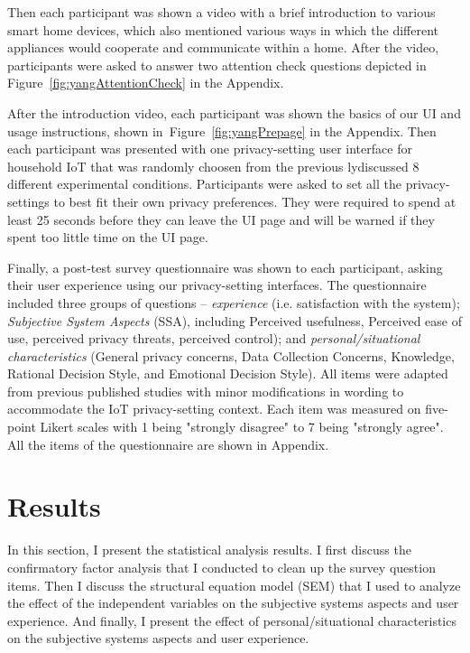 Then each participant was shown a video with a brief introduction to various smart home devices, which also mentioned various ways in which the different appliances would cooperate and communicate within a home. After the video, participants were asked to answer two attention check questions depicted in Figure~\ref{fig:yangAttentionCheck} in the Appendix.

After the introduction video, each participant was shown the basics of our UI and usage instructions, shown in~Figure~\ref{fig:yangPrepage} in the Appendix. Then each participant was presented with one privacy-setting user interface for household IoT that was randomly choosen from the previous lydiscussed 8 different experimental conditions. Participants were asked to set all the privacy-settings to best fit their own privacy preferences. They were required to spend at least 25 seconds before they can leave the UI page and will be warned if they spent too little time on the UI page.

Finally, a post-test survey questionnaire was shown to each participant, asking their user experience using our privacy-setting interfaces. The questionnaire included three groups of questions -- \textit{experience} (i.e. satisfaction with the system); \textit{Subjective System Aspects} (SSA), including Perceived usefulness, Perceived ease of use, perceived privacy threats, perceived control); and \textit{personal/situational characteristics} (General privacy concerns, Data Collection Concerns, Knowledge, Rational Decision Style, and Emotional Decision Style). All items were adapted from previous published studies with minor modifications in wording to accommodate the IoT privacy-setting context. Each item was measured on five-point Likert scales with 1 being "strongly disagree" to 7 being "strongly agree". All the items of the questionnaire are shown in Appendix.



\section{Results}
In this section, I present the statistical analysis results. I first discuss the confirmatory factor analysis that I conducted to clean up the survey question items. Then I discuss the structural equation model (SEM) that I used to analyze the effect of the independent variables on the subjective systems aspects and user experience. And finally, I present the effect of personal/situational characteristics on the subjective systems aspects and user experience.

